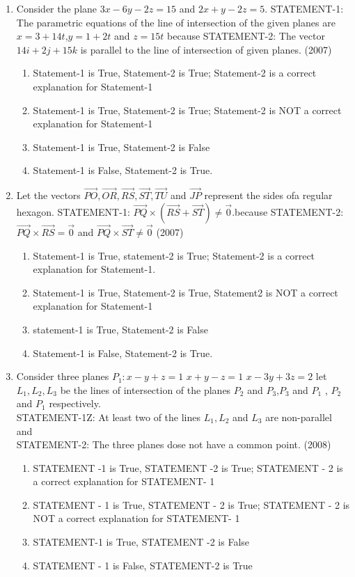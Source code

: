 \documentclass[12pt]{article}
\providecommand{\brak}[1]{\ensuremath{\left(#1\right)}}
\begin{document}
\begin{enumerate}
\item Consider the plane $3x-6y-2z=15$ and $2x+y-2z=5$.
 STATEMENT-1: The parametric equations of the line of intersection of the given planes are $x=3+14t$,$y=1+2t$ and $z=15t$ because
 STATEMENT-2: The vector $14i + 2j+15k$ is parallel to the line of intersection of given planes. (2007)
\begin{enumerate}
\item Statement-1 is True, Statement-2 is True; Statement-2 is a correct explanation for Statement-1 
\item Statement-1 is True, Statement-2 is True; Statement-2 is NOT a correct explanation for Statement-1
\item Statement-1 is True, Statement-2 is False
\item Statement-1 is False, Statement-2 is True.
\end{enumerate}
\item Let the vectors $\vec{PO}, \vec{OR}, \vec{RS}, \vec{ST}, \vec{TU}$ and $\vec{JP}$ represent the sides ofa regular hexagon.
STATEMENT-1: $\vec{PQ}\times\brak{\vec{RS}+\vec{ST}}\neq \vec{0}$.because
 STATEMENT-2: $\vec{PQ}\times\vec{RS}=\vec{0}$ and $\vec{PQ}\times \vec{ST}\neq \vec{0}$
 (2007)
 \begin{enumerate}
\item Statement-1 is True, statement-2 is True; Statement-2 is a correct explanation for Statement-1.
\item Statement-1 is True, Statement-2 is True, Statement2 is NOT a correct explanation for Statement-1
\item  statement-1 is True, Statement-2 is False
\item  Statement-1 is False, Statement-2 is True.
\end{enumerate}
\item Consider three planes $P_1:x-y+z=1$ $x+y-z=1$ $x-3y+3z=2$ let $L_1,L_2,L_3$ be the lines of intersection of the planes $P_2$ and $P_3$,$P_3$ and $P_1$ , $P_2$ and $P_1$ respectively.\\
STATEMENT-1Z: At least two of the lines $L_1, L_2$ and $L_3$ are non-parallel and\\
STATEMENT-2: The three planes dose not have a common point. (2008)
\begin{enumerate}
\item STATEMENT -1 is True, STATEMENT -2 is True; STATEMENT - 2 is a correct explanation for STATEMENT- 1
\item STATEMENT - 1 is True, STATEMENT - 2 is True; STATEMENT - 2 is NOT a correct explanation for STATEMENT- 1
\item STATEMENT-1 is True, STATEMENT -2 is False
\item STATEMENT - 1 is False, STATEMENT-2 is True
\end{enumerate}

\end{enumerate}
\end{document}
